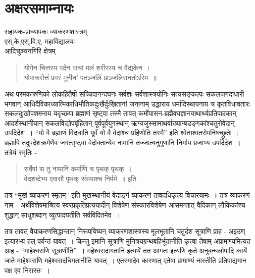 {\fontsize{15}{17}\selectfont
\presetvalues
\chapter{अक्षरसमाम्नायः}

\begin{center}
\smallskip

सहायक-प्राध्यापकः व्याकरणशास्त्रम्\\
एस्,के,एस्,वि,ए, महाविद्यालयः\\
आदिचुञ्चनगिरि क्षेत्रम् 
\addrule
\end{center}

\begin{verse}
योगेन चित्तस्य पदेन वाचां मलं शरीरस्य च वैद्यकेन~। \\
योपाकरोत्तं प्रवरं मुनीनां पतञ्जलिं प्राञ्जलिरानतोऽस्मि~॥
\end{verse}
अथ परमकारुणिको लोकहितैषी सच्चिदानन्दघनः सर्वज्ञः सर्वशास्त्रयोनिः सत्यसङ्कल्पः सकल\-जगदाधारी भगवान् आधिदैविकाध्यात्मिकाधिभौतिकदुःखैर्दुःखितानां जनानाम् उद्धाराय \break धर्मादिस्थापनाय च कृतविधावतारः सकलदुःखोपशमनाय यदृच्छया ब्रह्माणं सृष्ट्वा तस्मै \-तावत् कर्मोपासन-ब्रह्मैक्यज्ञानयाथार्थ्यप्रतिपादकान् आदर्शस्थानीयान् सकलविद्योपबृंहितान् पूर्वपूर्वयुगस्थान् ऋग्यजुस्सामाथर्वाख्यान्षडङ्गकांश्चतुरोवेदान् उपदिदेश~। “यो वै ब्रह्माणं \-विदधाति पूर्वं यो वै वेदांश्च प्रहिणोति तस्मै” इति श्वेताश्वतरोपनिषच्छ्रुतेः~। ब्रह्मापि तदुप\-देशक्रमेणैव जगत्सृष्ट्वा वेदोक्तान्येव नामानि तज्जात्यनुगुणानि निर्माय प्रजाभ्य उपदिदेश~। तत्रेयं स्मृतिः -		
\begin{verse}
सर्वेषां स तु नामानि कर्माणि च पृथक् पृथक्~। \\
वेदशब्देभ्य एवासौ पृथक् संस्थाश्च निर्ममे~॥ इति
\end{verse} 		
तत्र “मुखं व्याकरणं स्मृतम्” इति मुखस्थानीयं वेदाङ्गं व्याकरणं तावदधिकृत्य विचारयामः~। तत्र व्याकरणं नाम  - अर्थविशेषमाश्रित्य स्वरप्रकृतिप्रत्ययादीन् विशेषेण संस्कारविशेषेण आसमन्तात्  वैदिकान् लौकिकांश्च शुद्धान् साधुशब्दान् व्युत्पादयतीति सर्वविदितमेव~। 

तत्र तावत् वैयाकरणसिद्धान्तान् निरूपयिष्यन् व्याकरणशास्त्रस्य मूलभूतानि चतुर्दश \break सूत्राणि प्राह - अइउण् इत्यारभ्य हल् पर्यन्तं यावत्~। किन्तु इमानि सूत्राणि मुनित्रयग्रन्थ\-बहिर्भूतानीति कृत्वा तेषाम् अप्रामाण्यमित्यत आह - “माहेश्वराणि सूत्राणीति”~। महेश्वरादागतानि इत्यर्थे तत आगतः इत्यणि कृते अनुबन्धलोपादि कार्ये जाते माहेश्वराणि महेश्वरादधिगतानीति यावत्~। एतस्मादेव कारणात् एतेषां प्रामाण्यं नास्तीति प्रतिपाद्यमान पक्ष एव निरास्तः~। 

}
